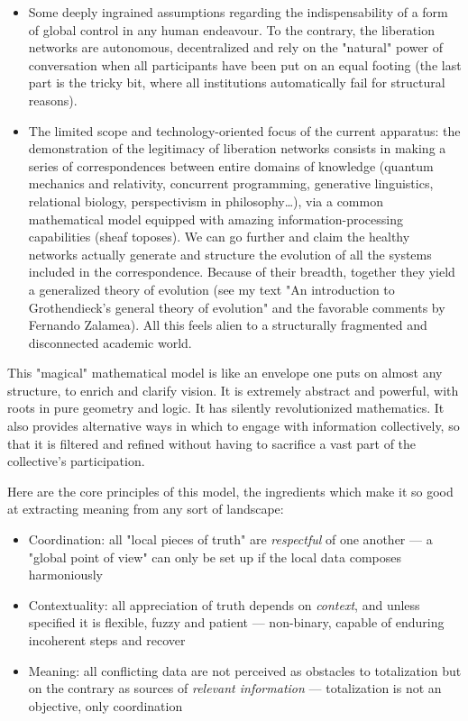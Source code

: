 \documentclass[11pt]{article}
\begin{document}
\begin{itemize}

\item Some deeply ingrained assumptions regarding the indispensability of a form of global
control in any human endeavour. To the contrary, the liberation networks are autonomous,
decentralized and rely on the "natural" power of conversation when all participants have
been put on an equal footing (the last part is the tricky bit, where all institutions
automatically fail for structural reasons).

\item The limited scope and technology-oriented focus of the current apparatus: the
demonstration of the legitimacy of liberation networks consists in making a series of
correspondences between entire domains of knowledge (quantum mechanics and relativity,
concurrent programming, generative linguistics, relational biology, perspectivism in
philosophy\ldots{}), via a common mathematical model equipped with amazing
information-processing capabilities (sheaf toposes). We can go further and claim the
healthy networks actually generate and structure the evolution of all the systems
included in the correspondence. Because of their breadth, together they yield a
generalized theory of evolution (see my text "An introduction to Grothendieck's general
theory of evolution" and the favorable comments by Fernando Zalamea). All this feels
alien to a structurally fragmented and disconnected academic world.

\end{itemize}

This "magical" mathematical model is like an envelope one puts on almost any structure,
to enrich and clarify vision. It is extremely abstract and powerful, with roots in pure
geometry and logic. It has silently revolutionized mathematics. It also provides
alternative ways in which to engage with information collectively, so that it is
filtered and refined without having to sacrifice a vast part of the collective's
participation.

Here are the core principles of this model, the ingredients which make it so good at
extracting meaning from any sort of landscape:

\begin{itemize}

\item Coordination: all "local pieces of truth" are \emph{respectful} of one another --- a
"global point of view" can only be set up if the local data composes harmoniously

\item Contextuality: all appreciation of truth depends on \emph{context}, and unless specified
it is flexible, fuzzy and patient --- non-binary, capable of enduring incoherent steps
and recover

\item Meaning: all conflicting data are not perceived as obstacles to totalization but on the
contrary as sources of \emph{relevant information} --- totalization is not an objective,
only coordination

\end{itemize}
\end{document}
